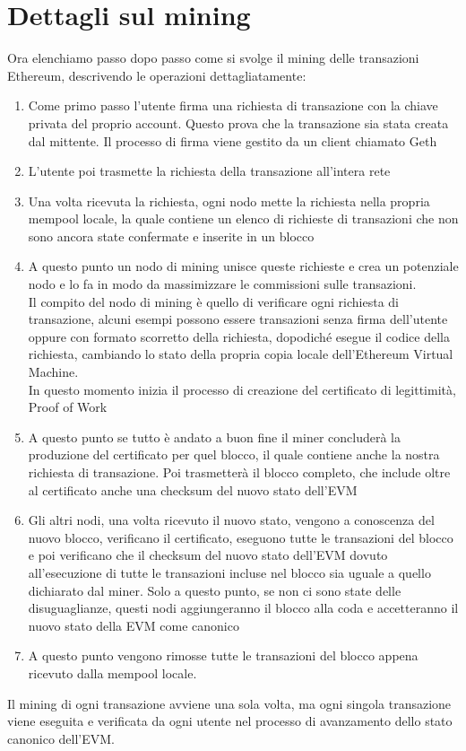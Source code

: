 \documentclass[a4paper,11pt]{report}
\begin{document}
\section{Dettagli sul mining}
Ora elenchiamo passo dopo passo come si svolge il mining delle transazioni Ethereum, descrivendo le operazioni dettagliatamente:
\begin{enumerate} %
\item Come primo passo l'utente firma una richiesta di transazione con la chiave privata del proprio account. Questo prova che la transazione sia stata creata dal mittente. Il processo di firma viene gestito da un client chiamato Geth 
\item L'utente poi trasmette la richiesta della transazione all'intera rete
\item Una volta ricevuta la richiesta, ogni nodo mette la richiesta nella propria mempool locale, la quale contiene un elenco di richieste di transazioni che non sono ancora state confermate e inserite in un blocco
\item A questo punto un nodo di mining unisce queste richieste e crea un potenziale nodo e lo fa in modo da massimizzare le commissioni sulle transazioni.\\ Il compito del nodo di mining è quello di verificare ogni richiesta di transazione, alcuni esempi possono essere transazioni senza firma dell'utente oppure con formato scorretto della richiesta, dopodiché esegue il codice della richiesta, cambiando lo stato della propria copia locale dell'Ethereum Virtual Machine.\\
In questo momento inizia il processo di creazione del certificato di legittimità, Proof of Work
\item A questo punto se tutto è andato a buon fine il miner concluderà la produzione del certificato per quel blocco, il quale contiene anche la nostra richiesta di transazione. Poi trasmetterà il blocco completo, che include oltre al certificato anche una checksum del nuovo stato dell'EVM 
\item Gli altri nodi, una volta ricevuto il nuovo stato, vengono a conoscenza del nuovo blocco, verificano il certificato, eseguono tutte le transazioni del blocco e poi verificano che il checksum del nuovo stato dell'EVM dovuto all'esecuzione di tutte le transazioni incluse nel blocco sia uguale a quello dichiarato dal miner. Solo a questo punto, se non ci sono state delle disuguaglianze, questi nodi aggiungeranno il blocco alla coda e accetteranno il nuovo stato della EVM come canonico
\item A questo punto vengono rimosse tutte le transazioni del blocco appena ricevuto dalla mempool locale.
\end{enumerate}
Il mining di ogni transazione avviene una sola volta, ma ogni singola transazione viene eseguita e verificata da ogni utente nel processo di avanzamento dello stato canonico dell'EVM.
\end{document}
